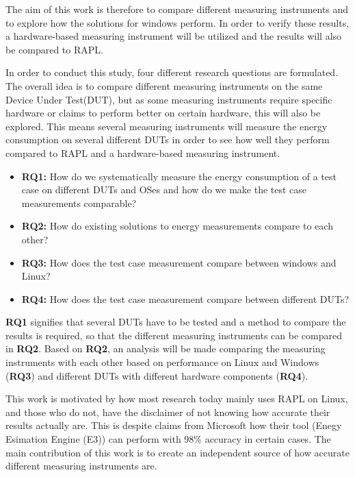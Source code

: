 The aim of this work is therefore to compare different measuring instruments and to explore how the solutions for windows perform. 
In order to verify these results, a hardware-based measuring instrument will be utilized and the results will also be compared to RAPL.

In order to conduct this study, four different research questions are formulated. The overall idea is to compare different measuring instruments on the same Device Under Test(DUT), but as some measuring instruments require specific hardware or claims to perform better on certain hardware, this will also be explored. This means several measuring instruments will measure the energy consumption on several different DUTs in order to see how well they perform compared to RAPL and a hardware-based measuring instrument.


\begin{itemize}
    \item \textbf{RQ1:} How do we systematically measure the energy consumption of a test case on different DUTs and OSes and how do we make the test case measurements comparable?
    \item \textbf{RQ2:} How do existing solutions to energy measurements compare to each other?
    \item \textbf{RQ3:} How does the test case measurement compare between windows and Linux?
    \item \textbf{RQ4:} How does the test case measurement compare between different DUTs?
\end{itemize}

\textbf{RQ1} signifies that several DUTs have to be tested and a method to compare the results is required, so that the different measuring instruments can be compared in \textbf{RQ2}. Based on \textbf{RQ2}, an analysis will be made comparing the measuring instruments with each other based on performance on Linux and Windows (\textbf{RQ3}) and different DUTs with different hardware components (\textbf{RQ4}).

This work is motivated by how most research today mainly uses RAPL on Linux\cite[]{Rasmussen2021,Pereira2017,Theilmann2022,Lindholt2022}, and those who do not, have the disclaimer of not knowing how accurate their results actually are\cite[]{Bruce2015ReducingEC, Ozturk2019, Unlu2021}. This is despite claims from Microsoft how their tool (Enegy Esimation Engine (E3)) can perform with 98\% accuracy in certain cases\cite[]{E3WinHec}. The main contribution of this work is to create an independent source of how accurate different measuring instruments are.





